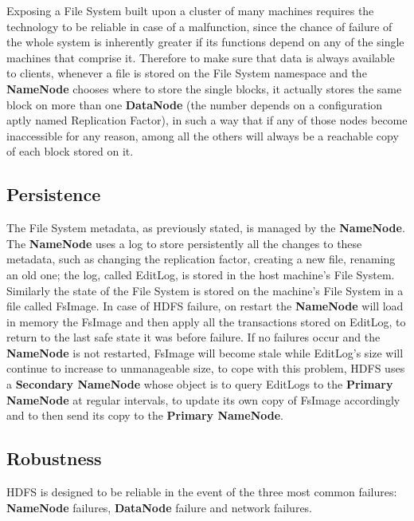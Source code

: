 Exposing a File System built upon a cluster of many machines requires the technology to be reliable in case of a malfunction, since the chance of failure of the whole system is inherently greater if its functions depend on any of the single machines that comprise it. \newline Therefore to make sure that data is always available to clients, whenever a file is stored on the File System namespace and the \textbf{NameNode} chooses where to store the single blocks, it actually stores the same block on more than one \textbf{DataNode} (the number depends on a configuration aptly named Replication Factor), in such a way that if any of those nodes become inaccessible for any reason, among all the others will always be a reachable copy of each block stored on it.

\subsection{Persistence}

The File System metadata, as previously stated, is managed by the \textbf{NameNode}. The \textbf{NameNode} uses a log to store persistently all the changes to these metadata, such as changing the replication factor, creating a new file, renaming an old one; the log, called EditLog, is stored in the host machine's File System. Similarly the state of the File System is stored on the machine's File System in a file called FsImage.\newline
In case of HDFS failure, on restart the \textbf{NameNode} will load in memory the FsImage and then apply all the transactions stored on EditLog, to return to the last safe state it was before failure.
\newline
If no failures occur and the \textbf{NameNode} is not restarted, FsImage will become stale while EditLog's size will continue to increase to unmanageable size, to cope with this problem, HDFS uses a \textbf{Secondary NameNode} whose object is to query EditLogs to the \textbf{Primary NameNode} at regular intervals, to update its own copy of FsImage accordingly and to then send its copy to the \textbf{Primary NameNode}.

\subsection{Robustness}

HDFS is designed to be reliable in the event of the three most common failures: \textbf{NameNode} failures, \textbf{DataNode} failure and network failures.

